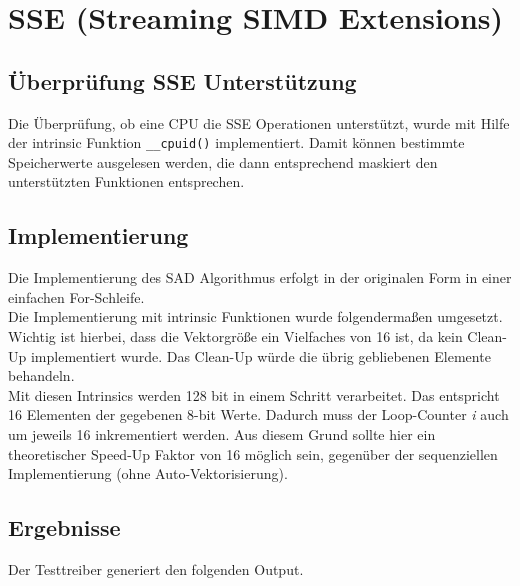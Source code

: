 \section{SSE (Streaming SIMD Extensions)}

\subsection{Überprüfung SSE Unterstützung}

Die Überprüfung, ob eine CPU die SSE Operationen unterstützt, wurde mit Hilfe der intrinsic Funktion \texttt{\_\_cpuid()} implementiert. Damit können bestimmte Speicherwerte ausgelesen werden, die dann entsprechend maskiert den unterstützten Funktionen entsprechen.\\


\subsection{Implementierung}

Die Implementierung des SAD Algorithmus erfolgt in der originalen Form in einer einfachen For-Schleife.\\


Die Implementierung mit intrinsic Funktionen wurde folgendermaßen umgesetzt. Wichtig ist hierbei, dass die Vektorgröße ein Vielfaches von 16 ist, da kein Clean-Up implementiert wurde. Das Clean-Up würde die übrig gebliebenen Elemente behandeln.\\


Mit diesen Intrinsics werden 128 bit in einem Schritt verarbeitet. Das entspricht 16 Elementen der gegebenen 8-bit Werte. Dadurch muss der Loop-Counter \textit{i} auch um jeweils 16 inkrementiert werden. Aus diesem Grund sollte hier ein theoretischer Speed-Up Faktor von 16 möglich sein, gegenüber der sequenziellen Implementierung (ohne Auto-Vektorisierung).

\subsection{Ergebnisse}

Der Testtreiber generiert den folgenden Output.\\


